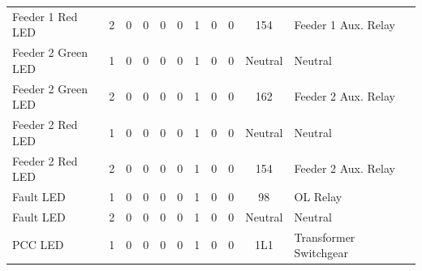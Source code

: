 \begin{table}[!htp]
{\begin{tabular}{lcccccccccll}
			Feeder 1 Red LED           & 2                       & 0                                           & 0                                          & 0           & 0           & 1            & 0                & 0 & 154                          & Feeder 1 Aux. Relay              &                \\
			Feeder 2 Green LED         & 1                       & 0                                           & 0                                          & 0           & 0           & 1            & 0                & 0 & Neutral                      & Neutral                          &                \\
			Feeder 2 Green LED         & 2                       & 0                                           & 0                                          & 0           & 0           & 1            & 0                & 0 & 162                          & Feeder 2 Aux. Relay              &                \\
			Feeder 2 Red LED           & 1                       & 0                                           & 0                                          & 0           & 0           & 1            & 0                & 0 & Neutral                      & Neutral                          &                \\
			Feeder 2 Red LED           & 2                       & 0                                           & 0                                          & 0           & 0           & 1            & 0                & 0 & 154                          & Feeder 2 Aux. Relay              &                \\
			Fault LED                  & 1                       & 0                                           & 0                                          & 0           & 0           & 1            & 0                & 0 & 98                           & OL Relay                         &                \\
			Fault LED                  & 2                       & 0                                           & 0                                          & 0           & 0           & 1            & 0                & 0 & Neutral                      & Neutral                          &                \\
			PCC LED                    & 1                       & 0                                           & 0                                          & 0           & 0           & 1            & 0                & 0 & 1L1                          & Transformer Switchgear           &                \\

\end{tabular}}
\end{table}
